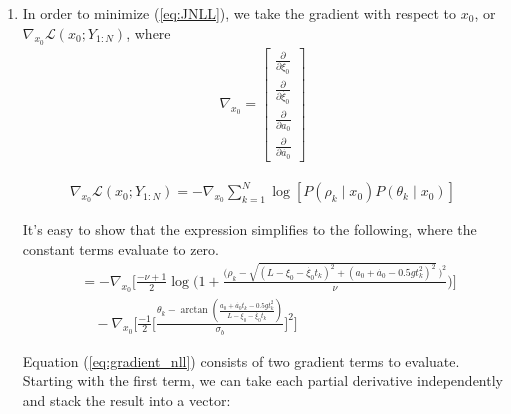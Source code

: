 \documentclass[11pt]{article}
\begin{document}
\begin{enumerate}[label=\alph*)]
    Both the NLL and NLS cost functions seek to find an $x_0$ that minimizes the cost function given observations $Y_{1:N}$, however they each approach the problem differently.
    NLS is defined to minimize the sum of the squared residuals, while maximum likelihood tries to find the $x_0$ which makes `the most sense' given all the observations. Both assume the measurement noise characteristics 
    are known, NLS uses a least squares cost function, meaning we only consider the 1st/2nd order moments. As we have seen with the Student's-t distribution, this does not accurately capture higher order moments. Maximum likelihood is robust to non-Gaussian
    sensor noise unlike the least-squares cost function we have selected for NLS. 
    \item
    In order to minimize (\ref{eq:JNLL}), we take the gradient with respect to $x_0$, or \(\nabla_{x_0}\mathcal{L}(x_0;Y_{1:N})\), where
    \begin{align*} 
        \nabla_{x_0} = \begin{bmatrix}
            \frac{\partial}{\partial \xi_0} \\
            \frac{\partial}{\partial \dot{\xi_0}} \\
            \frac{\partial}{\partial a_0} \\
            \frac{\partial}{\partial \dot{a_0}}
        \end{bmatrix}
    \end{align*}

\begin{align*}
    \nabla_{x_0}\mathcal{L}(x_0;Y_{1:N}) = -\nabla_{x_0} \sum_{k=1}^N \log[P(\rho_k \mid x_0) P(\theta_k \mid x_0)]
\end{align*}

It's easy to show that the expression simplifies to the following, where the constant terms evaluate to zero.
\begin{equation}
    \begin{split}
        &= -\nabla_{x_0}\Bigg[\frac{-\nu+1}{2}\log\Bigg(1+ \frac{\Big(\rho_k - \sqrt{(L-\xi_0 - \dot{\xi_0}t_k)^2 + (a_0 + \dot{a_0} - 0.5gt_k^2)^2} \ \Big)^2}{\nu}\Bigg)\Bigg] \\
        &\quad -\nabla_{x_0}\Big[\frac{-1}{2}\Big[\frac{\theta_k - \arctan(\frac{a_0 + \dot{a_0}t_k - 0.5gt_k^2}{L-\xi_0-\dot{\xi_0}t_k})}{\sigma_b}\Big]^2\Big]
    \end{split}
    \label{eq:gradient_nll}
\end{equation}

Equation (\ref{eq:gradient_nll}) consists of two gradient terms to evaluate. Starting with the first term, we can take each partial derivative independently and stack the result into a vector:


\end{enumerate}
\end{document}
